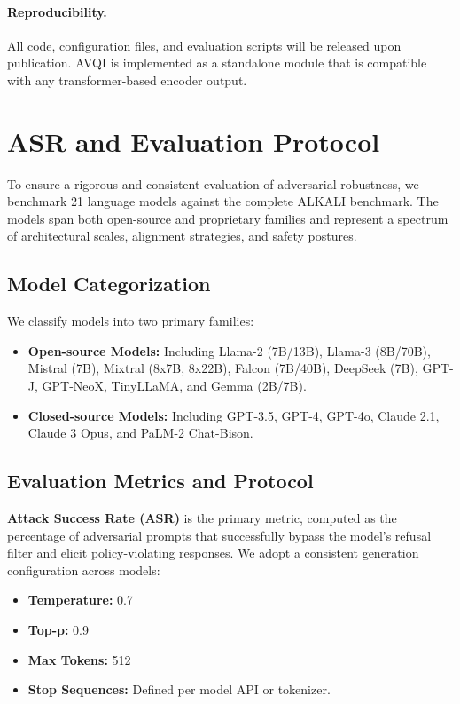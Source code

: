 \paragraph{Reproducibility.} All code, configuration files, and evaluation scripts will be released upon publication. AVQI is implemented as a standalone module that is compatible with any transformer-based encoder output.




\section{ASR and Evaluation Protocol}
\label{sec:appendix_models}

To ensure a rigorous and consistent evaluation of adversarial robustness, we benchmark 21 language models against the complete ALKALI benchmark. The models span both open-source and proprietary families and represent a spectrum of architectural scales, alignment strategies, and safety postures.

\subsection{Model Categorization}
We classify models into two primary families:
\begin{itemize}
    \item \textbf{Open-source Models:} Including Llama-2 (7B/13B), Llama-3 (8B/70B), Mistral (7B), Mixtral (8x7B, 8x22B), Falcon (7B/40B), DeepSeek (7B), GPT-J, GPT-NeoX, TinyLLaMA, and Gemma (2B/7B).
    \item \textbf{Closed-source Models:} Including GPT-3.5, GPT-4, GPT-4o, Claude 2.1, Claude 3 Opus, and PaLM-2 Chat-Bison.
\end{itemize}

\subsection{Evaluation Metrics and Protocol}
\textbf{Attack Success Rate (ASR)} is the primary metric, computed as the percentage of adversarial prompts that successfully bypass the model's refusal filter and elicit policy-violating responses. We adopt a consistent generation configuration across models:
\begin{itemize}
    \item \textbf{Temperature:} 0.7
    \item \textbf{Top-p:} 0.9
    \item \textbf{Max Tokens:} 512
    \item \textbf{Stop Sequences:} Defined per model API or tokenizer.
\end{itemize}

